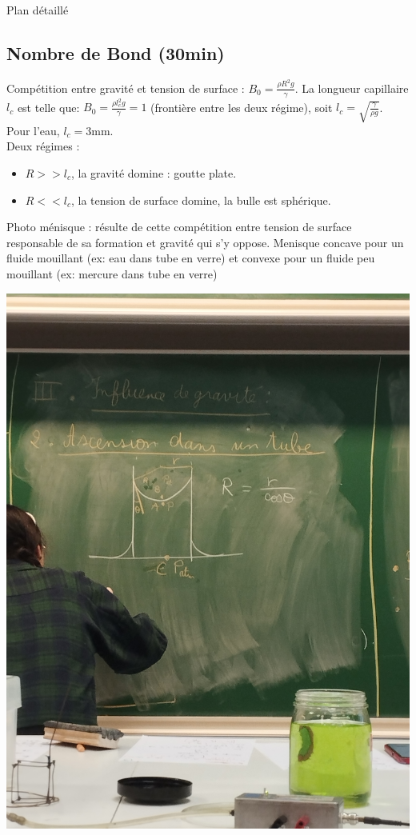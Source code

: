 \begin{reportBlock}{Plan détaillé}
  \subsection{Nombre de Bond (30min)}
  Compétition entre gravité et tension de surface : $B_0=\frac{\rho R^2g}{\gamma}$. La longueur capillaire $l_c$ est telle que: $B_0=\frac{\rho l_c^2g}{\gamma}=1$ (frontière entre les deux régime), soit $l_c = \sqrt{\frac{\gamma}{\rho g}}$.
  Pour l'eau, $l_c=3$mm.\\
  Deux régimes : 
  \begin{itemize}
      \item $R>>l_c$, la gravité domine : goutte plate.
      \item $R<<l_c$, la tension de surface domine, la bulle est sphérique.
  \end{itemize}
  Photo ménisque : résulte de cette compétition entre tension de surface responsable de sa formation et gravité qui s'y oppose. Menisque concave pour un fluide mouillant (ex: eau dans tube en verre) et convexe pour un fluide peu mouillant (ex: mercure dans tube en verre)
  \begin{center}
      \includegraphics[scale=0.1]{LP_TensionSurface/Menisque.jpg}
  \end{center}


\end{reportBlock}
